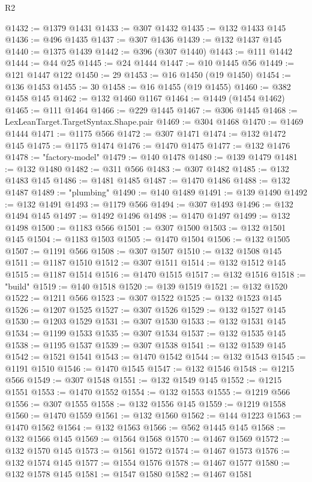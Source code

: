 \begin{lexlean}{R2}
\begin{coremodule}
@1432 := @1379 @1431
@1433 := @307 @1432
@1435 := @132 @1433 @145
@1436 := @496 @1435
@1437 := @307 @1436
@1439 := @132 @1437 @145
@1440 := @1375 @1439
@1442 := @396 (@307 @1440)
@1443 := @111 @1442
@1444 := @44 @25
@1445 := @24 @1444
@1447 := @10 @1445 @56
@1449 := @121 @1447 @122
@1450 := 29
@1453 := @16 @1450 (@19 @1450)
@1454 := @136 @1453
@1455 := 30
@1458 := @16 @1455 (@19 @1455)
@1460 := @382 @1458 @145
@1462 := @132 @1460 @1167
@1464 := @1449 (@1454 @1462)
@1465 := @111 @1464
@1466 := @229 @1445
@1467 := @306 @1445
@1468 := LexLeanTarget.TargetSyntax.Shape.pair
@1469 := @304 @1468
@1470 := @1469 @1444
@1471 := @1175 @566
@1472 := @307 @1471
@1474 := @132 @1472 @145
@1475 := @1175 @1474
@1476 := @1470 @1475
@1477 := @132 @1476
@1478 := "factory-model"
@1479 := @140 @1478
@1480 := @139 @1479
@1481 := @132 @1480
@1482 := @311 @566
@1483 := @307 @1482
@1485 := @132 @1483 @145
@1486 := @1481 @1485
@1487 := @1470 @1486
@1488 := @132 @1487
@1489 := "plumbing"
@1490 := @140 @1489
@1491 := @139 @1490
@1492 := @132 @1491
@1493 := @1179 @566
@1494 := @307 @1493
@1496 := @132 @1494 @145
@1497 := @1492 @1496
@1498 := @1470 @1497
@1499 := @132 @1498
@1500 := @1183 @566
@1501 := @307 @1500
@1503 := @132 @1501 @145
@1504 := @1183 @1503
@1505 := @1470 @1504
@1506 := @132 @1505
@1507 := @1191 @566
@1508 := @307 @1507
@1510 := @132 @1508 @145
@1511 := @1187 @1510
@1512 := @307 @1511
@1514 := @132 @1512 @145
@1515 := @1187 @1514
@1516 := @1470 @1515
@1517 := @132 @1516
@1518 := "build"
@1519 := @140 @1518
@1520 := @139 @1519
@1521 := @132 @1520
@1522 := @1211 @566
@1523 := @307 @1522
@1525 := @132 @1523 @145
@1526 := @1207 @1525
@1527 := @307 @1526
@1529 := @132 @1527 @145
@1530 := @1203 @1529
@1531 := @307 @1530
@1533 := @132 @1531 @145
@1534 := @1199 @1533
@1535 := @307 @1534
@1537 := @132 @1535 @145
@1538 := @1195 @1537
@1539 := @307 @1538
@1541 := @132 @1539 @145
@1542 := @1521 @1541
@1543 := @1470 @1542
@1544 := @132 @1543
@1545 := @1191 @1510
@1546 := @1470 @1545
@1547 := @132 @1546
@1548 := @1215 @566
@1549 := @307 @1548
@1551 := @132 @1549 @145
@1552 := @1215 @1551
@1553 := @1470 @1552
@1554 := @132 @1553
@1555 := @1219 @566
@1556 := @307 @1555
@1558 := @132 @1556 @145
@1559 := @1219 @1558
@1560 := @1470 @1559
@1561 := @132 @1560
@1562 := @144 @1223
@1563 := @1470 @1562
@1564 := @132 @1563
@1566 := @562 @1445 @145
@1568 := @132 @1566 @145
@1569 := @1564 @1568
@1570 := @1467 @1569
@1572 := @132 @1570 @145
@1573 := @1561 @1572
@1574 := @1467 @1573
@1576 := @132 @1574 @145
@1577 := @1554 @1576
@1578 := @1467 @1577
@1580 := @132 @1578 @145
@1581 := @1547 @1580
@1582 := @1467 @1581

\end{coremodule}
\end{lexlean}
